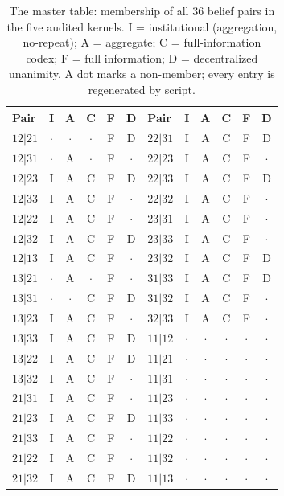 \documentclass[10pt,twocolumn]{article}
\theoremstyle{definition}
\begin{document}
\begin{table}[t]
\centering
\footnotesize
\caption{The master table: membership of all 36 belief pairs in the five
audited kernels. I = institutional (aggregation, no-repeat); A =
aggregate; C = full-information codex; F = full information; D =
decentralized unanimity. A dot marks a non-member; every entry is
regenerated by script.}
\label{tab:master}
\begin{tabular}{@{}l cccc c@{\hspace{12pt}}l cccc c@{}}
\toprule
Pair & I & A & C & F & D & Pair & I & A & C & F & D\\
\midrule
$12|21$ & $\cdot$ & $\cdot$ & $\cdot$ & F & D &
$22|31$ & I & A & C & F & D\\
$12|31$ & $\cdot$ & A & $\cdot$ & F & $\cdot$ &
$22|23$ & I & A & C & F & $\cdot$\\
$12|23$ & I & A & C & F & D &
$22|33$ & I & A & C & F & D\\
$12|33$ & I & A & C & F & $\cdot$ &
$22|32$ & I & A & C & F & $\cdot$\\
$12|22$ & I & A & C & F & $\cdot$ &
$23|31$ & I & A & C & F & $\cdot$\\
$12|32$ & I & A & C & F & D &
$23|33$ & I & A & C & F & $\cdot$\\
$12|13$ & I & A & C & F & $\cdot$ &
$23|32$ & I & A & C & F & D\\
$13|21$ & $\cdot$ & A & $\cdot$ & F & $\cdot$ &
$31|33$ & I & A & C & F & D\\
$13|31$ & $\cdot$ & $\cdot$ & C & F & D &
$31|32$ & I & A & C & F & $\cdot$\\
$13|23$ & I & A & C & F & $\cdot$ &
$32|33$ & I & A & C & F & $\cdot$\\
$13|33$ & I & A & C & F & D &
$11|12$ & $\cdot$ & $\cdot$ & $\cdot$ & $\cdot$ & $\cdot$\\
$13|22$ & I & A & C & F & D &
$11|21$ & $\cdot$ & $\cdot$ & $\cdot$ & $\cdot$ & $\cdot$\\
$13|32$ & I & A & C & F & $\cdot$ &
$11|31$ & $\cdot$ & $\cdot$ & $\cdot$ & $\cdot$ & $\cdot$\\
$21|31$ & I & A & C & F & $\cdot$ &
$11|23$ & $\cdot$ & $\cdot$ & $\cdot$ & $\cdot$ & $\cdot$\\
$21|23$ & I & A & C & F & D &
$11|33$ & $\cdot$ & $\cdot$ & $\cdot$ & $\cdot$ & $\cdot$\\
$21|33$ & I & A & C & F & $\cdot$ &
$11|22$ & $\cdot$ & $\cdot$ & $\cdot$ & $\cdot$ & $\cdot$\\
$21|22$ & I & A & C & F & $\cdot$ &
$11|32$ & $\cdot$ & $\cdot$ & $\cdot$ & $\cdot$ & $\cdot$\\
$21|32$ & I & A & C & F & D &
$11|13$ & $\cdot$ & $\cdot$ & $\cdot$ & $\cdot$ & $\cdot$\\
\bottomrule
\end{tabular}
\end{table}
\end{document}

